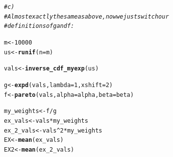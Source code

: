 \documentclass{article}\usepackage[]{graphicx}\usepackage[]{color}
\makeatletter
\newcommand{\hlnum}[1]{\textcolor[rgb]{0.686,0.059,0.569}{#1}}%
\newcommand{\hlcom}[1]{\textcolor[rgb]{0.678,0.584,0.686}{\textit{#1}}}%
\newcommand{\hlopt}[1]{\textcolor[rgb]{0,0,0}{#1}}%
\newcommand{\hlstd}[1]{\textcolor[rgb]{0.345,0.345,0.345}{#1}}%
\newcommand{\hlkwb}[1]{\textcolor[rgb]{0.69,0.353,0.396}{#1}}%
\newcommand{\hlkwc}[1]{\textcolor[rgb]{0.333,0.667,0.333}{#1}}%
\newcommand{\hlkwd}[1]{\textcolor[rgb]{0.737,0.353,0.396}{\textbf{#1}}}%
\newenvironment{kframe}{%
 \def\at@end@of@kframe{}%
 \ifinner\ifhmode%
  \def\at@end@of@kframe{\end{minipage}}%
  \begin{minipage}{\columnwidth}%
 \fi\fi%
 \def\FrameCommand##1{\hskip\@totalleftmargin \hskip-\fboxsep
 \colorbox{shadecolor}{##1}\hskip-\fboxsep
     \hskip-\linewidth \hskip-\@totalleftmargin \hskip\columnwidth}%
 \MakeFramed {\advance\hsize-\width
   \@totalleftmargin\z@ \linewidth\hsize
   \@setminipage}}%
 {\par\unskip\endMakeFramed%
 \at@end@of@kframe}
\newenvironment{knitrout}{}{} %
\makeatother
\begin{document}
\begin{knitrout}
\color{fgcolor}\begin{kframe}
\begin{alltt}
\hlcom{# c)}
\hlcom{# Almost exactly the same as above, now we just switch our}
\hlcom{# definitions of g and f:}

\hlstd{m} \hlkwb{<-} \hlnum{10000}
\hlstd{us} \hlkwb{<-} \hlkwd{runif}\hlstd{(}\hlkwc{n}\hlstd{=m)}

\hlstd{vals} \hlkwb{<-} \hlkwd{inverse_cdf_myexp}\hlstd{(us)}

\hlstd{g} \hlkwb{<-} \hlkwd{expd}\hlstd{(vals,} \hlkwc{lambda} \hlstd{=} \hlnum{1}\hlstd{,} \hlkwc{xshift}\hlstd{=}\hlnum{2}\hlstd{)}
\hlstd{f} \hlkwb{<-} \hlkwd{pareto}\hlstd{(vals,}\hlkwc{alpha}\hlstd{=alpha,}\hlkwc{beta}\hlstd{=beta)}

\hlstd{my_weights} \hlkwb{<-} \hlstd{f} \hlopt{/} \hlstd{g}
\hlstd{ex_vals} \hlkwb{<-} \hlstd{vals} \hlopt{*} \hlstd{my_weights}
\hlstd{ex_2_vals} \hlkwb{<-} \hlstd{vals}\hlopt{^}\hlnum{2} \hlopt{*} \hlstd{my_weights}
\hlstd{EX} \hlkwb{<-} \hlkwd{mean}\hlstd{(ex_vals)}
\hlstd{EX2} \hlkwb{<-} \hlkwd{mean}\hlstd{(ex_2_vals)}


\end{alltt}
\end{kframe}
\end{knitrout}
\end{document}

